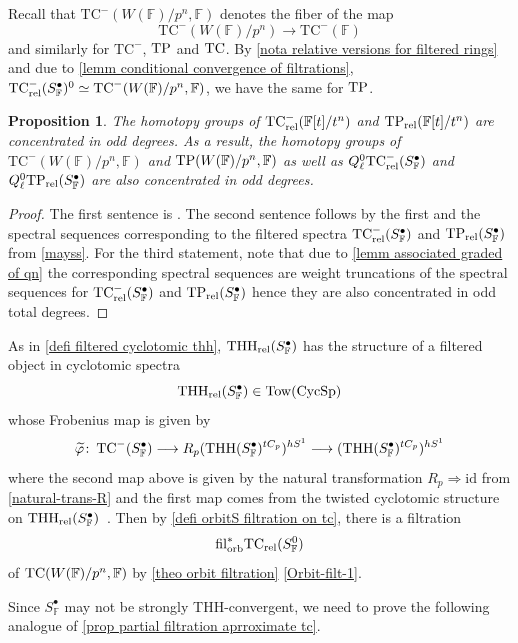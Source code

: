\documentclass[english,10pt]{amsart}
\newcommand{\rel}{\textup{rel}}
\newcommand{\field}{\mathbb{F}}
\newtheorem{prop}{Proposition}[section]
\theoremstyle{definition}
\numberwithin{equation}{section}
\newcommand{\ntc}{\mathrm{TC}^{-}}
\DeclareMathOperator{\tp}{\ensuremath{\textup{TP}}}
\DeclareMathOperator{\tc}{\ensuremath{\textup{TC}}}
\newcommand{\rntc}{\mathrm{TC}_{\rel}^{-}}
\newcommand{\rtp}{\mathrm{TP}_{\rel}}
\newcommand{\rtc}{\mathrm{TC}_{\rel}}
\newcommand{\rthh}{\mathrm{THH}_{\rel}}
\DeclareMathOperator{\cycsp}{\ensuremath{\textup{CycSp}}}
\newcommand{\filorb}{\mathrm{fil}^{*}_{\textup{orb}}}
\newcommand{\Tow}{\mathrm{Tow}}
\def\co{\colon\thinspace}
\begin{document}
Recall that $\ntc(W(\field)/p^n,\field)$  denotes the fiber of the map 
\[\ntc(W(\field)/p^n) \to \ntc(\field)\]
and similarly for $\ntc$, $\tp$ and $\tc$. By \autoref{nota relative versions for filtered rings} and due to \autoref{lemm conditional convergence of filtrations},  $\rntc(S_{\field}^{\bullet})^0 \simeq \ntc(W(\field)/p^n,\field)$, we have the same for $\tp$.
\begin{prop}\label{prop speirs odd ntc and ntp}
The homotopy groups of $\rntc(\field[t]/t^n)$ and $\rtp(\field[t]/t^n)$ are concentrated in odd degrees. As a result, 
the homotopy groups of $\ntc(W(\field)/p^n,\field)$ and $\tp(W(\field)/p^n,\field)$ as well as $Q_{\ell}^0\rntc(S_{\field}^\bullet)$ and $Q_{\ell}^0 \rtp(S_{\field}^{\bullet})$ are also concentrated in odd degrees. 

\end{prop}
\begin{proof}
The first sentence is \cite[Proposition 12]{speirs2020truncatedpolynomial}. The second sentence follows by the first and the spectral sequences corresponding to the filtered spectra $\rntc(S_{\field}^\bullet)$ and $\rtp(S_{\field}^\bullet)$ from \autoref{mayss}. For the third statement, note that due to \autoref{lemm associated graded of qn} the corresponding  spectral sequences are weight truncations of the spectral sequences for $\rntc(S_{\field}^\bullet)$ and $\rtp(S_{\field}^\bullet)$ hence they are also concentrated in odd total degrees. 
\end{proof}

As in \autoref{defi filtered cyclotomic thh}, $\rthh(S_{\field}^{\bullet})$ has the structure of a filtered object in cyclotomic spectra 
\[\rthh(S_{\field}^{\bullet}) \in \Tow(\cycsp)\]
whose Frobenius map is given by 
\[\widetilde{\varphi} \co \mathrm{TC}^{-}(S_{\field}^{\bullet})\longrightarrow R_p (\mathrm{THH}(S_{\field}^{\bullet})^{tC_p})^{hS^1} \longrightarrow (\mathrm{THH}(S_{\field}^{\bullet})^{tC_p})^{hS^1}\]
where the second map above is given by the natural transformation $R_p \Rightarrow \mathrm{id}$ from \autoref{natural-trans-R} and the first map comes from the twisted cyclotomic structure on $\rthh(S_{\field}^{\bullet})$~\cite[Appendix~A]{antieau2020beilinson}. Then by \autoref{defi orbitS filtration on tc}, there is a filtration 
\[\filorb \rtc(S_{\field}^0)\]
of $\tc(W(\field)/p^n,\field)$  by \autoref{theo orbit filtration} \eqref{Orbit-filt-1}.

Since $S_{\field}^{\bullet}$ may not be strongly THH-convergent, we need to prove the following analogue of \autoref{prop partial filtration aprroximate tc}.
\end{document}
